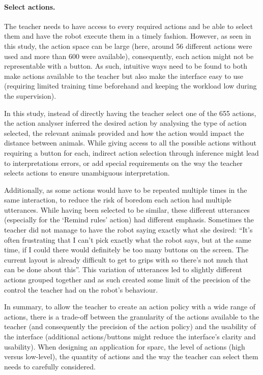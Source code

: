 \paragraph{Select actions.} %

The teacher needs to have access to every required actions and be able to select them and have the robot execute them in a timely fashion. However, as seen in this study, the action space can be large (here, around 56 different actions were used and more than 600 were available), consequently, each action might not be representable with a button. As such, intuitive ways need to be found to both make actions available to the teacher but also make the interface easy to use (requiring limited training time beforehand and keeping the workload low during the supervision). 

In this study, instead of directly having the teacher select one of the 655 actions, the action analyser inferred the desired action by analysing the type of action selected, the relevant animals provided and how the action would impact the distance between animals. While giving access to all the possible actions without requiring a button for each, indirect action selection through inference might lead to interpretations errors, or add special requirements on the way the teacher selects actions to ensure unambiguous interpretation. 

Additionally, as some actions would have to be repeated multiple times in the same interaction, to reduce the risk of boredom each action had multiple utterances. While having been selected to be similar, these different utterances (especially for the `Remind rules' action) had different emphasis. Sometimes the teacher did not manage to have the robot saying exactly what she desired: ``It’s often frustrating that I can’t pick exactly what the robot says, but at the same time, if I could there would definitely be too many buttons on the screen. The current layout is already difficult to get to grips with so there’s not much that can be done about this''. This variation of utterances led to slightly different actions grouped together and as such created some limit of the precision of the control the teacher had on the robot's behaviour.

In summary, to allow the teacher to create an action policy with a wide range of actions, there is a trade-off between the granularity of the actions available to the teacher (and consequently the precision of the action policy) and the usability of the interface (additional actions/buttons might reduce the interface's clarity and usability). When designing an application for \gls{sparc}, the level of actions (high versus low-level), the quantity of actions and the way the teacher can select them needs to carefully considered.

